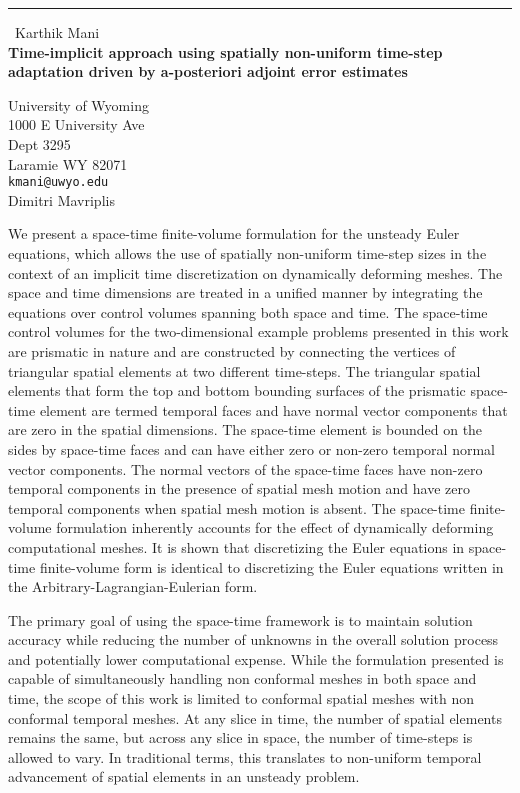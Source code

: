 \documentclass{report}
\begin{document}
\begin{center}
\rule{6in}{1pt} \
{\large Karthik Mani \\
{\bf Time-implicit approach using spatially non-uniform time-step adaptation driven by a-posteriori adjoint error estimates}}

University of Wyoming \\ 1000 E University Ave \\ Dept 3295 \\ Laramie WY 82071
\\
{\tt kmani@uwyo.edu}\\
Dimitri Mavriplis\end{center}

We present a space-time finite-volume formulation for the unsteady Euler
equations, which allows the use of spatially non-uniform time-step sizes
in the context of an implicit time discretization on dynamically
deforming meshes. The space and time dimensions are treated in a unified
manner by integrating the equations over control volumes spanning both
space and time. The space-time control volumes for the two-dimensional
example problems presented in this work are prismatic in nature and are
constructed by connecting the vertices of triangular spatial elements at
two different time-steps. The triangular spatial elements that form the
top and bottom bounding surfaces of the prismatic space-time element are
termed temporal faces and have normal vector components that are zero in
the spatial dimensions. The space-time element is bounded on the sides by
space-time faces and can have either zero or non-zero temporal normal
vector components. The normal vectors of the space-time faces have
non-zero temporal components in the presence of spatial mesh motion and
have zero temporal components when spatial mesh motion is absent. The
space-time finite-volume formulation inherently accounts for the effect
of dynamically deforming computational meshes. It is shown that
discretizing the Euler equations in space-time finite-volume form is
identical to discretizing the Euler equations written in the
Arbitrary-Lagrangian-Eulerian form.

The primary goal of using the space-time framework is to maintain
solution accuracy while reducing the number of unknowns in the overall
solution process and potentially lower computational expense. While the
formulation presented is capable of simultaneously handling non conformal
meshes in both space and time, the scope of this work is limited to
conformal spatial meshes with non conformal temporal meshes. At any slice
in time, the number of spatial elements remains the same, but across any
slice in space, the number of time-steps is allowed to vary. In
traditional terms, this translates to non-uniform temporal advancement of
spatial elements in an unsteady problem.
\end{document}
